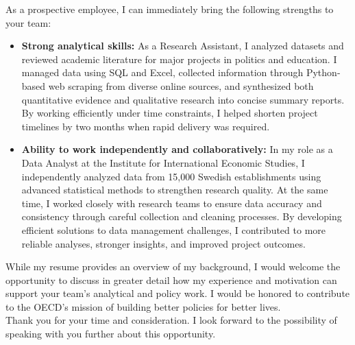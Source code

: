 \documentclass[11pt,a4paper,roman]{moderncv}
\begin{document}
As a prospective employee, I can immediately bring the following strengths to your team:
\vspace{0.5em}
\begin{itemize}
\item \textbf{Strong analytical skills:} As a Research Assistant, I analyzed datasets and reviewed academic literature for major projects in politics and education. I managed data using SQL and Excel, collected information through Python-based web scraping from diverse online sources, and synthesized both quantitative evidence and qualitative research into concise summary reports. By working efficiently under time constraints, I helped shorten project timelines by two months when rapid delivery was required.
\item \textbf{Ability to work independently and collaboratively:} In my role as a Data Analyst at the Institute for International Economic Studies, I independently analyzed data from 15,000 Swedish establishments using advanced statistical methods to strengthen research quality. At the same time, I worked closely with research teams to ensure data accuracy and consistency through careful collection and cleaning processes. By developing efficient solutions to data management challenges, I contributed to more reliable analyses, stronger insights, and improved project outcomes.
\end{itemize}

\vspace{1em}
While my resume provides an overview of my background, I would welcome the opportunity to discuss in greater detail how my experience and motivation can support your team's analytical and policy work. I would be honored to contribute to the OECD's mission of building better policies for better lives.\\

\vspace{1em}
Thank you for your time and consideration. I look forward to the possibility of speaking with you further about this opportunity.

\vspace{0.5cm}


\makeletterclosing
\end{document}
